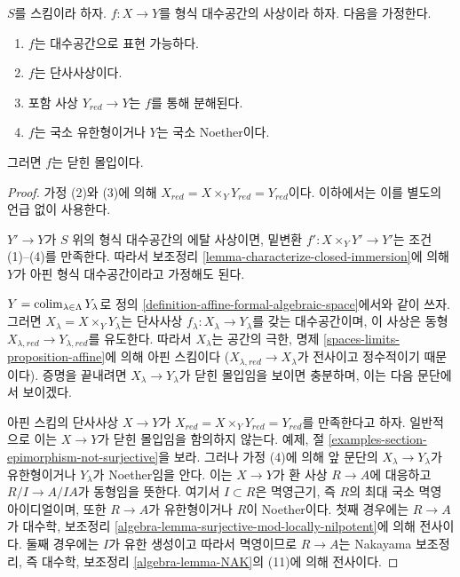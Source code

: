 \begin{lemma}
\label{lemma-monomorphism-iso-over-red}
$S$를 스킴이라 하자. $f : X \to Y$를 형식 대수공간의 사상이라 하자.
다음을 가정한다.
\begin{enumerate}
\item $f$는 대수공간으로 표현 가능하다.
\item $f$는 단사사상이다.
\item 포함 사상 $Y_{red} \to Y$는 $f$를 통해 분해된다.
\item $f$는 국소 유한형이거나 $Y$는 국소 Noether이다.
\end{enumerate}
그러면 $f$는 닫힌 몰입이다.
\end{lemma}

\begin{proof}
가정 (2)와 (3)에 의해
$X_{red} = X \times_Y Y_{red} = Y_{red}$이다.
이하에서는 이를 별도의 언급 없이 사용한다.

\medskip\noindent
$Y' \to Y$가 $S$ 위의 형식 대수공간의 에탈 사상이면, 밑변환
$f' : X \times_Y Y' \to Y'$는 조건 (1)--(4)를 만족한다.
따라서 보조정리 \ref{lemma-characterize-closed-immersion}에 의해
$Y$가 아핀 형식 대수공간이라고 가정해도 된다.

\medskip\noindent
$Y = \mathop{\mathrm{colim}}\nolimits_{\lambda \in \Lambda} Y_\lambda$로 정의
\ref{definition-affine-formal-algebraic-space}에서와 같이 쓰자.
그러면 $X_\lambda = X \times_Y Y_\lambda$는 단사사상
$f_\lambda : X_\lambda \to Y_\lambda$를 갖는 대수공간이며, 이 사상은
동형 $X_{\lambda, red} \to Y_{\lambda, red}$를 유도한다.
따라서 $X_\lambda$는 공간의 극한, 명제
\ref{spaces-limits-proposition-affine}에 의해 아핀 스킴이다
($X_{\lambda, red} \to X_\lambda$가 전사이고 정수적이기 때문이다).
증명을 끝내려면 $X_\lambda \to Y_\lambda$가 닫힌 몰입임을 보이면
충분하며, 이는 다음 문단에서 보이겠다.

\medskip\noindent
아핀 스킴의 단사사상 $X \to Y$가
$X_{red} = X \times_Y Y_{red} = Y_{red}$를 만족한다고 하자.
일반적으로 이는 $X \to Y$가
닫힌 몰입임을 함의하지 않는다. 예제, 절
\ref{examples-section-epimorphism-not-surjective}을 보라.
그러나 가정 (4)에 의해 앞 문단의 $X_\lambda \to Y_\lambda$가
유한형이거나 $Y_\lambda$가 Noether임을 안다. %
이는 $X \to Y$가 환 사상 $R \to A$에 대응하고
$R/I \to A/IA$가 동형임을 뜻한다. 여기서 $I \subset R$은
멱영근기, 즉 $R$의 최대 국소 멱영 아이디얼이며, 또한
$R \to A$가 유한형이거나 $R$이 Noether이다. 첫째 경우에는
$R \to A$가 대수학, 보조정리
\ref{algebra-lemma-surjective-mod-locally-nilpotent}에 의해 전사이다.
둘째 경우에는 $I$가 유한 생성이고 따라서 멱영이므로
$R \to A$는 Nakayama 보조정리, 즉 대수학, 보조정리
\ref{algebra-lemma-NAK}의 (11)에 의해 전사이다.
\end{proof}


